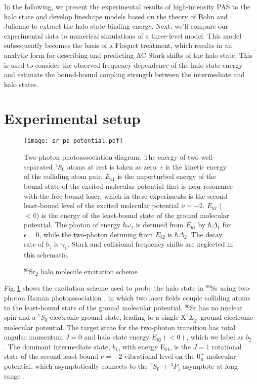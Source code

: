 In the following, we present the experimental results of high-intensity PAS to the halo state and develop lineshape models based on the theory of Bohn and Julienne to extract the halo state binding energy.
Next, we'll compare our experimental data to numerical simulations of a three-level model.
This model subsequently becomes the basis of a Floquet treatment, which results in an analytic form for describing and predicting AC Stark shifts of the halo state.
This is used to consider the observed frequency dependence of the halo state energy and estimate the bound-bound coupling strength between the intermediate and halo states.

\section{Experimental setup} \label{sec:highE_methods}
	\begin{figure} 
	\centerline{
	  \texttt{[image: sr\_pa\_potential.pdf]}}
	  \caption{$^{86}$Sr$_2$ halo molecule excitation scheme}{Two-photon photoassociation diagram. The energy of two well-separated $^1S_0$ atoms at rest is taken as zero. $\epsilon$ is the kinetic energy of the colliding atom pair. $E_{b1}$ is the unperturbed energy of the bound state of the excited molecular potential that is near resonance with the free-bound laser, which in these experiments is the second-least-bound level of the excited molecular potential $\nu=-2$. $E_{b2}$ ($<0$) is the energy of the least-bound state of the ground molecular potential. The photon of energy $\hbar \omega_1$ is detuned from $E_{b1}$ by $\hbar \Delta_1$ for $\epsilon=0$, while the two-photon detuning from $E_{b2}$ is $\hbar \Delta_2$. The decay rate of $b_1$ is $\gamma_1$. Stark and collisional frequency shifts are neglected in this schematic.}
	  \label{fig:PASDiagram}
	\end{figure}
Fig.\,\ref{fig:PASDiagram} shows the excitation scheme used to probe the halo state in $^{86}$Sr using two-photon Raman photoassociation \cite{Jones2006}, in which two laser fields couple colliding atoms to the least-bound state of the ground molecular potential. 
$^{86}$Sr has no nuclear spin and a $^1S_0$ electronic ground state, leading to a single X$^1\Sigma_g^+$ ground electronic molecular potential.
The target state for the two-photon transition has total angular momentum $J=0$ and halo state energy $E_{b2}(<0)$, which we label as $b_2$.
The dominant intermediate state, $b_1$, with energy E$_{b1}$, is the $J=1$ rotational state of the second least-bound $\nu=-2$ vibrational level on the $0^+_u$ molecular potential, which asymptotically connects to the $^1S_0\,+\,^3P_1$ asymptote at long range \cite{MartinezDeEscobar2008}.
